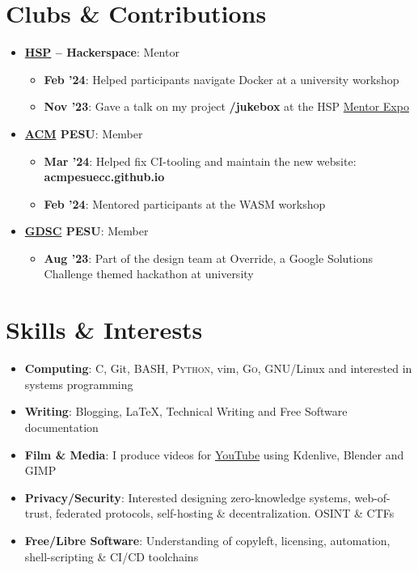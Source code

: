 \documentclass[letterpaper, 11pt]{article}
\newcommand{\resumeItem}[2]{
  \item\small{
    \textbf{#1}{: #2 \vspace{-2pt}}
  }
}
\newcommand{\resumeSubItem}[2]{\resumeItem{#1}{#2}\vspace{-4pt}}
\newcommand{\resumeSubHeadingListStart}{\begin{itemize}[leftmargin=*]}
\newcommand{\resumeSubHeadingListEnd}{\end{itemize}}
\begin{document}
{\section{Clubs \& Contributions}
  \resumeSubHeadingListStart
  \resumeSubItem{\href{https://www.hsp-ec.xyz}{HSP} -- Hackerspace}
     {Mentor}
     \begin{itemize}
      \item{\textbf{Feb '24}: Helped participants navigate Docker at a university workshop}
      \item \textbf{Nov '23}: Gave a talk on my project \textbf{/jukebox} at the HSP {\href{https://www.instagram.com/p/CzydraKSE8q/}{Mentor Expo}}
    \end{itemize}
    \resumeSubItem{\href{https://pesuecc.acm.org}{ACM} PESU} 
     {Member}
    \begin{itemize}
      \item \textbf{Mar '24}: Helped fix CI-tooling and maintain the new website: \textbf{acmpesuecc.github.io}
      \item \textbf{Feb '24}: Mentored participants at the WASM workshop
  \end{itemize}
   \resumeSubItem{\href{https://gdsc.community.dev/pes-university-electronic-city-campus-bengaluru/}{GDSC} PESU}
     {Member}
     \begin{itemize}
     \item \textbf{Aug '23}: Part of the design team at Override, a Google Solutions Challenge themed hackathon at university
    \end{itemize}
  \resumeSubHeadingListEnd
  

  \section{Skills \& Interests}
  \resumeSubHeadingListStart
  \resumeSubItem{Computing}
  {\textsc{C}, Git, \textsc{BASH}, \textsc{Python}, vim, \textsc{Go}, GNU/Linux and interested in systems programming}
  \resumeSubItem{Writing}
  {Blogging, \LaTeX, Technical Writing and Free Software documentation}
  \resumeSubItem{Film \& Media}
  {I produce videos for {\href{https://polarhive.net/videos}{YouTube}} using Kdenlive, Blender and GIMP}
  \resumeSubItem{Privacy/Security}
  {Interested designing zero-knowledge systems, web-of-trust, federated protocols, self-hosting \& decentralization. OSINT \& CTFs}
  \resumeSubItem{Free/Libre Software}
  {Understanding of copyleft, licensing, automation, shell-scripting \& CI/CD toolchains}
  \resumeSubHeadingListEnd
  
}
\end{document}
